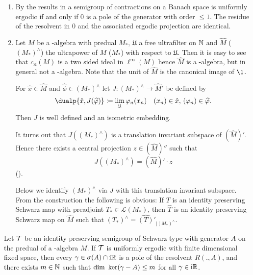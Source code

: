 \begin{remarks}\label{rem:d3-2.4}
\begin{enumerate}[\upshape (i), wide, labelindent=.25em]
\item
By the results in \textcite{lin:1974} a semigroup of contractions on a Banach space is uniformly ergodic if and only if\/ $0$ is a pole of the generator with order $\leq 1$.
The residue of the resolvent in $0$ and the associated ergodic projection are identical.

\item
Let $M$ be a \WA-algebra with predual $M_{*}$, $\mathfrak{U}$ a free ultrafilter on $\mathbb{N} $ and $\widehat{M}$ (\resp  $(M_{*})^{\wedge}$) the ultrapower of\/ $M$ (\resp  $M_{*}$) with respect to $\mathfrak{U}$.
Then it is easy to see that $c_{\mathfrak{U}}(M)$ is a two sided ideal in $\ell^{\infty}(M)$ hence $\widehat{M}$ is a \CA-algebra, but in general not a \WA-algebra.
Note that the unit of\/ $\widehat{M}$ is the canonical image of\/ $\1$.

For $\hat{x} \in \widehat{M}$ and $\widehat{\phi} \in (M_{*})^{\wedge}$ let $J \colon (M_{*})^{\wedge} \to \widehat{M}'$ be defined by
\[
\dualp{\hat{x},J(\widehat{\phi})} 
	\coloneq \lim_{\mathfrak{U}}\phi_{n}(x_{n}) \quad 
		(x_{n}) \in \hat{x}, \, (\phi_{n}) \in \widehat{\phi} .
\]
Then $J$ is well defined and an isometric embedding.

It turns out that $J( (M_{*})^{\wedge} )$ is a translation invariant subspace of\/ $(\widehat{M})'$.
Hence there exists a central projection $z \in (\widehat{M})''$ such that 
%
\[
	J((M_{*})^{\wedge}) = (\widehat{M})' \cdot z 
\]
%
(\textcite[Proposition 2.2]{groh:1984b}).

Below we identify $(M_{*})^{\wedge}$ via $J$ with this translation invariant subspace.
From the construction the following is obvious: If\/ $T$ is an identity preserving Schwarz map with preadjoint $T_{*} \in \mathcal{L}(M_{*})$, then $\widehat{T}$ is an identity preserving Schwarz map on $\widehat{M}$ such that $(T_{*})^{\wedge} = \widehat{(T)}{}'_{\vert (M_{*})^{\wedge}}$.
\end{enumerate}
\end{remarks}
\begin{theorem}\label{thm:d3-2.5}
Let $\mathcal{T}$ be an identity preserving semigroup of Schwarz type with generator $A$ on the predual of a \WA-algebra $M$.
If\/ $\mathcal{T}$ is uniformly ergodic with finite dimensional fixed space, then every $\gamma \in \sigma(A) \cap \mathrm{i}\mathbb{R}$ is a pole of the resolvent $R(.,A)$, and there exists $m \in \mathbb{N}$ such that $\dim \Kern{\gamma - A} \leq m$ for all $\gamma \in \mathrm{i}\mathbb{R}$.
\end{theorem}
